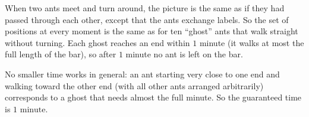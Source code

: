 When two ants meet and turn around, the picture is the same as if they had passed through each other, except that the ants exchange labels. So the set of positions at every moment is the same as for ten ``ghost'' ants that walk straight without turning. Each ghost reaches an end within $1$ minute (it walks at most the full length of the bar), so after $1$ minute no ant is left on the bar.

No smaller time works in general: an ant starting very close to one end and walking toward the other end (with all other ants arranged arbitrarily) corresponds to a ghost that needs almost the full minute. So the guaranteed time is $\boxed{1\text{ minute}}$.
